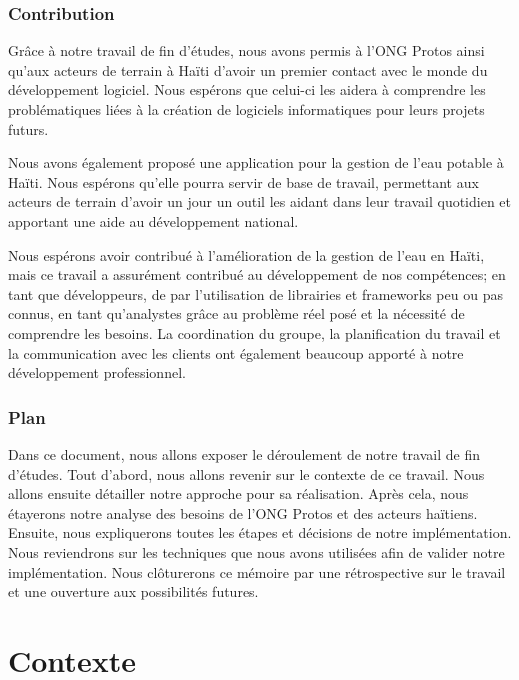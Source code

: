 \documentclass{EPL-master-thesis-covers-FR}
\begin{document}
		\subsection*{Contribution}

			Grâce à notre travail de fin d'études, nous avons permis à l'ONG Protos ainsi qu'aux acteurs de terrain à Haïti d'avoir un premier contact avec le monde du développement logiciel. Nous espérons que celui-ci les aidera à comprendre les problématiques liées à la création de logiciels informatiques pour leurs projets futurs.

			Nous avons également proposé une application pour la gestion de l'eau potable à Haïti. Nous espérons qu'elle pourra servir de base de travail, permettant aux acteurs de terrain d'avoir un jour un outil les aidant dans leur travail quotidien et apportant une aide au développement national.

			Nous espérons avoir contribué à l'amélioration de la gestion de l'eau en Haïti, mais ce travail a assurément contribué au développement de nos compétences; en tant que développeurs, de par l'utilisation de librairies et frameworks peu ou pas connus, en tant qu'analystes grâce au problème réel posé et la nécessité de comprendre les besoins. La coordination du groupe, la planification du travail et la communication avec les clients ont également beaucoup apporté à notre développement professionnel.

		\subsection*{Plan}

			Dans ce document, nous allons exposer le déroulement de notre travail de fin d'études. Tout d'abord, nous allons revenir sur le contexte de ce travail. Nous allons ensuite détailler notre approche pour sa réalisation. Après cela, nous étayerons notre analyse des besoins de l'ONG Protos et des acteurs haïtiens. Ensuite, nous expliquerons toutes les étapes et décisions de notre implémentation. Nous reviendrons sur les techniques que nous avons utilisées afin de valider notre implémentation. Nous clôturerons ce mémoire par une rétrospective sur le travail et une ouverture aux possibilités futures.

	\chapter{Contexte}

\end{document}
